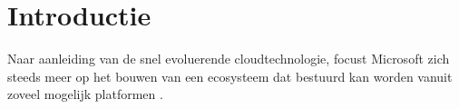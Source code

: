 
\section{Introductie}%
\label{sec:introductie}

\begin{comment}
Waarover zal je bachelorproef gaan? Introduceer het thema en zorg dat volgende zaken zeker duidelijk aanwezig zijn:

\begin{itemize}
  \item kaderen thema
  \item de doelgroep
  \item de probleemstelling en (centrale) onderzoeksvraag
  \item de onderzoeksdoelstelling
\end{itemize}

Denk er aan: een typische bachelorproef is \textit{toegepast onderzoek}, wat betekent dat je start vanuit een concrete probleemsituatie in bedrijfscontext, een \textbf{casus}. Het is belangrijk om je onderwerp goed af te bakenen: je gaat voor die \textit{ene specifieke probleemsituatie} op zoek naar een goede oplossing, op basis van de huidige kennis in het vakgebied.

De doelgroep moet ook concreet en duidelijk zijn, dus geen algemene of vaag gedefinieerde groepen zoals \emph{bedrijven}, \emph{developers}, \emph{Vlamingen}, enz. Je richt je in elk geval op it-professionals, een bachelorproef is geen populariserende tekst. Eén specifiek bedrijf (die te maken hebben met een concrete probleemsituatie) is dus beter dan \emph{bedrijven} in het algemeen.

Formuleer duidelijk de onderzoeksvraag! De begeleiders lezen nog steeds te veel voorstellen waarin we geen onderzoeksvraag terugvinden.

Schrijf ook iets over de doelstelling. Wat zie je als het concrete eindresultaat van je onderzoek, naast de uitgeschreven scriptie? Is het een proof-of-concept, een rapport met aanbevelingen, \ldots Met welk eindresultaat kan je je bachelorproef als een succes beschouwen?

\end{comment}

Naar aanleiding van de snel evoluerende cloudtechnologie, focust Microsoft zich steeds meer op het bouwen van een ecosysteem dat bestuurd kan worden vanuit zoveel mogelijk platformen \autocite{Parker2021}.

